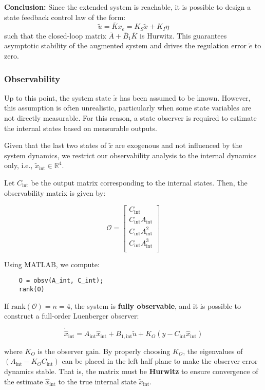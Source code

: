 \documentclass[]{report}
\begin{document}
\textbf{Conclusion:}  
Since the extended system is reachable, it is possible to design a state feedback control law of the form:
\[
\tilde{u} = \bar{K} x_e = K_S \tilde{x} + K_I \eta
\]
such that the closed-loop matrix $\bar{A} + \bar{B}_1 \bar{K}$ is Hurwitz. This guarantees asymptotic stability of the augmented system and drives the regulation error $\tilde{e}$ to zero.



\subsubsection{Observability}

Up to this point, the system state $\tilde{x}$ has been assumed to be known. However, this assumption is often unrealistic, particularly when some state variables are not directly measurable. For this reason, a state observer is required to estimate the internal states based on measurable outputs.

Given that the last two states of $\tilde{x}$ are exogenous and not influenced by the system dynamics, we restrict our observability analysis to the internal dynamics only, i.e., $\tilde{x}_{\text{int}} \in \mathbb{R}^4$.

Let $C_{\text{int}}$ be the output matrix corresponding to the internal states. Then, the observability matrix is given by:

\[
\mathcal{O} = \begin{bmatrix}
	C_{\text{int}} \\
	C_{\text{int}} A_{\text{int}} \\
	C_{\text{int}} A_{\text{int}}^2 \\
	C_{\text{int}} A_{\text{int}}^3 \\
\end{bmatrix}
\]

Using MATLAB, we compute:

\begin{verbatim}
	O = obsv(A_int, C_int);
	rank(O)
\end{verbatim}

If $\text{rank}(\mathcal{O}) = n = 4$, the system is \textbf{fully observable}, and it is possible to construct a full-order Luenberger observer:

\[
\dot{\hat{x}}_{\text{int}} = A_{\text{int}} \hat{x}_{\text{int}} + B_{1,\text{int}} \tilde{u} + K_O(y - C_{\text{int}} \hat{x}_{\text{int}})
\]

where $K_O$ is the observer gain. By properly choosing $K_O$, the eigenvalues of $(A_{\text{int}} - K_O C_{\text{int}})$ can be placed in the left half-plane to make the observer error dynamics stable. That is, the matrix must be \textbf{Hurwitz} to ensure convergence of the estimate $\hat{x}_{\text{int}}$ to the true internal state $\tilde{x}_{\text{int}}$.
\end{document}
